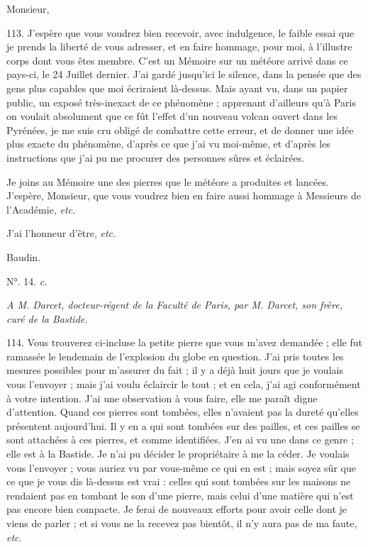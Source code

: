 \documentclass[a4paper, 11pt, oneside, polutonikogreek, french]{article}
\begin{document}
Monsieur,

113. \og J'espère que vous voudrez bien recevoir, avec indulgence, le faible essai que je prends la liberté de vous adresser, et en faire hommage, pour moi, à l'illustre corps dont vous êtes membre. C'est un Mémoire sur un météore arrivé dans ce pays-ci, le 24 Juillet dernier. J'ai gardé jusqu'ici le silence, dans la pensée que des gens plus capables que moi écriraient là-dessus. Mais ayant vu, dans un papier public, un exposé très-inexact de ce phénomène ; apprenant d'ailleurs qu'à Paris on voulait absolument que ce fût l'effet d'un nouveau volcan ouvert dans les Pyrénées, je me suis cru obligé de combattre cette erreur, et de donner une idée plus exacte du phénomène, d'après ce que j'ai vu moi-même, et d'après les instructions que j'ai pu me procurer des personnes sûres et éclairées. \fg

\og Je joins au Mémoire une des pierres que le météore a produites et lancées. J'espère, Monsieur, que vous voudrez bien en faire aussi hommage à Messieurs de l'Académie, \emph{etc.} \fg

J'ai l'honneur d'être, \emph{etc.}

Baudin.

\begin{center}
N°. 14. \emph{c.}
\end{center}

\begin{center}
\emph{A M. Darcet, docteur-régent de la Faculté de Paris, par M. Darcet, son frère, curé de la Bastide.}
\end{center}

114. \og Vous trouverez ci-incluse la petite pierre que vous m'avez demandée ; elle fut ramassée le lendemain de l'explosion du globe en question. J'ai pris toutes les mesures possibles pour m'assurer du fait ; il y a déjà huit jours que je voulais vous l'envoyer ; mais j'ai voulu éclaircir le tout ; et en cela, j'ai agi conformément à votre intention. J'ai une observation à vous faire, elle me paraît digne d'attention. Quand ces pierres sont tombées, elles n'avaient pas la dureté qu'elles présentent aujourd'hui. Il y en a qui sont tombées sur des pailles, et ces pailles se sont attachées à ces pierres, et comme identifiées. J'en ai vu une dans ce genre ; elle est à la Bastide. Je n'ai pu décider le propriétaire à me la céder. Je voulais vous l'envoyer ; vous auriez vu par vous-même ce qui en est ; mais soyez sûr que ce que je vous dis là-dessus est vrai : celles qui sont tombées sur les maisons ne rendaient pas en tombant le son d'une pierre, mais celui d'une matière qui n'est pas encore bien compacte. Je ferai de nouveaux efforts pour avoir celle dont je viens de parler ; et si vous ne la recevez pas bientôt, il n'y aura pas de ma faute, \emph{etc.} \fg
\end{document}
